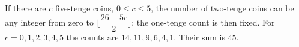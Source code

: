 If there are $c$ five-tenge coins, $0\le c\le5$, the number of two-tenge coins can be any integer from zero to $\lfloor\dfrac{26-5c}{2}\rfloor$; the one-tenge count is then fixed. For $c=0,1,2,3,4,5$ the counts are $14,11,9,6,4,1$. Their sum is $\boxed{45}$.
